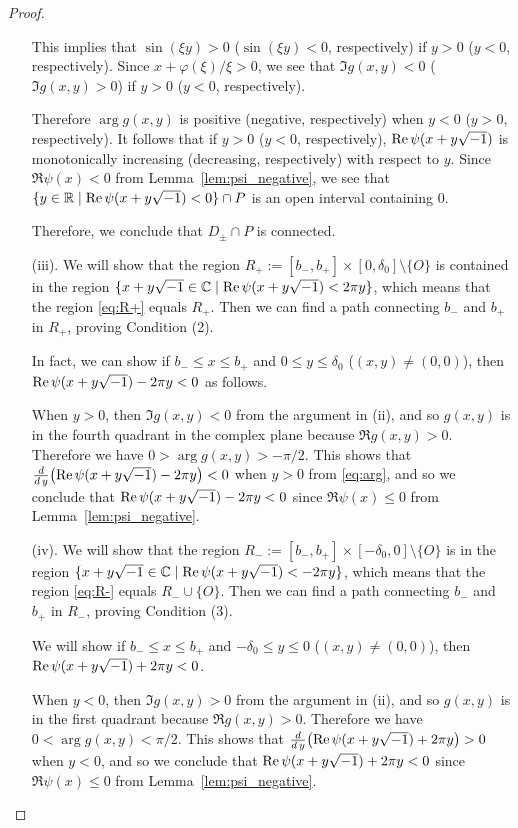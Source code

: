 \begin{proof}
\begin{enumerate}
This implies that $\sin(\xi y)>0$ ($\sin(\xi y)<0$, respectively) if $y>0$ ($y<0$, respectively).
Since $x+\varphi(\xi)/\xi>0$, we see that $\Im g(x,y)<0$ ($\Im g(x,y)>0$) if $y>0$ ($y<0$, respectively).
\par
Therefore $\arg{g(x,y)}$ is positive (negative, respectively) when $y<0$ ($y>0$, respectively).
It follows that if $y>0$ ($y<0$, respectively), $\Re\psi(x+y\i)$ is monotonically increasing (decreasing, respectively) with respect to $y$.
Since $\Re\psi(x)<0$ from Lemma~\ref{lem:psi_negative}, we see that $\{y\in\R\mid\Re\psi(x+y\i)<0\}\cap P$ is an open interval containing $0$.
\par
Therefore, we conclude that $D_{\pm}\cap P$ is connected.
\item[(iii).]
We will show that the region $R_{+}:=[b_{-},b_{+}]\times[0,\delta_0]\setminus\{O\}$ is contained in the region $\{x+y\sqrt{-1}\in\mathbb{C}\mid\operatorname{Re}\psi(x+y\sqrt{-1})<2\pi y\}$, which means that the region \eqref{eq:R+} equals $R_{+}$.
Then we can find a path connecting $b_{-}$ and $b_{+}$ in $R_{+}$, proving Condition (2).
\par
In fact, we can show if $b_{-}\le x\le b_{+}$ and $0\le y\le\delta_0$ ($(x,y)\ne(0,0)$), then $\operatorname{Re}\psi(x+y\sqrt{-1})-2\pi y<0$ as follows.
\par
When $y>0$, then $\Im g(x,y)<0$ from the argument in (ii), and so $g(x,y)$ is in the fourth quadrant in the complex plane because $\Re g(x,y)>0$.
Therefore we have $0>\arg g(x,y)>-\pi/2$.
This shows that $\frac{d}{d\,y}\bigl(\operatorname{Re}\psi(x+y\sqrt{-1})-2\pi y\bigr)<0$ when $y>0$ from \eqref{eq:arg}, and so we conclude that $\operatorname{Re}\psi(x+y\sqrt{-1})-2\pi y<0$ since $\Re\psi(x)\le0$ from Lemma~\ref{lem:psi_negative}.
\item[(iv).]
We will show that the region $R_{-}:=[b_{-},b_{+}]\times[-\delta_0,0]\setminus\{O\}$ is in the region $\{x+y\sqrt{-1}\in\mathbb{C}\mid\operatorname{Re}\psi(x+y\sqrt{-1})<-2\pi y\}$, which means that the region \eqref{eq:R-} equals $R_{-}\cup\{O\}$.
Then we can find a path connecting $b_{-}$ and $b_{+}$ in $R_{-}$, proving Condition (3).
\par
We will show if $b_{-}\le x\le b_{+}$ and $-\delta_0\le y\le0$ ($(x,y)\ne(0,0)$), then $\operatorname{Re}\psi(x+y\sqrt{-1})+2\pi y<0$.
\par
When $y<0$, then $\Im g(x,y)>0$ from the argument in (ii), and so $g(x,y)$ is in the first quadrant because $\Re g(x,y)>0$.
Therefore we have $0<\arg g(x,y)<\pi/2$.
This shows that $\frac{d}{d\,y}\bigl(\operatorname{Re}\psi(x+y\sqrt{-1})+2\pi y\bigr)>0$ when $y<0$, and so we conclude that $\operatorname{Re}\psi(x+y\sqrt{-1})+2\pi y<0$ since $\Re\psi(x)\le0$ from Lemma~\ref{lem:psi_negative}.
\end{enumerate}
\end{proof}
